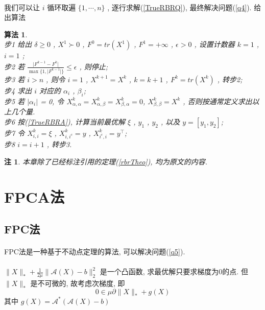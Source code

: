\documentclass[a4paper, UTF8]{ctexart}				%
\newtheorem{remark}{\bf 注}
\newtheorem{algo}{\bf 算法}
\numberwithin{equation}{section}				%
\newcommand{\upcite}[1]{\textsuperscript{\textsuperscript{\cite{#1}}}}
\begin{document}
			\paragraph{}
				\quad 我们可以让 $i$ 循环取遍 $\{1, \cdots, n\}$ , 逐行求解(\ref{TrueRBRQ}), 最终解决问题(\ref{q4}). 给出算法
				\begin{algo}
					\quad\\
					步1 \quad 给出 $\delta \ge 0$ , $X^1 \succ 0$ , $F^0 = tr(X^1)$ , $F^1 = + \infty$ , $\epsilon > 0$ , 设置计数器 $k = 1$ , $i = 1$ ;\\
					步2 \quad 若 $\frac{\lvert{F^{k - 1}-F^k}\rvert}{\max\{1,\lvert{F^{k - 1}}\rvert\}}\leq\epsilon$ , 则停止;\\
					步3 \quad 若 $i>n$ , 则令 $i=1$ , $X^{k + 1}=X^k$ , $k=k + 1$ , $F^k = tr(X^k)$ , 转步2;\\
					步4 \quad 求出 $i$ 对应的 $\alpha_i$ , $\beta_i$;\\
					步5 \quad 若 $\vert{\alpha_i}\vert$ = 0, 令 $X^k_{\alpha, \alpha} = X^k_{\alpha, \beta} = X^k_{\beta, \alpha} = 0$, $X^k_{\beta, \beta} = X^k$ , 否则按通常定义求出以上几个量.\\
					步6 \quad 按(\ref{TrueRBRA}), 计算当前最优解 $\xi$ , $y_1$ , $y_2$ , 以及 $y = [y_1, y_2]$;\\
					步7 \quad 令 $X^{k}_{i, i} = \xi$ , $X^{k}_{i, i^c} = y$ , $X^{k}_{i^c, i} = y^\top$;\\
					步8 \quad $i = i + 1$ , 转步3.\\
				\end{algo}

		\begin{remark}
			本章除了已经标注引用的定理(\ref{rbrTheo}), 均为原文\upcite{goldfarb2009solving}的内容.
		\end{remark}


	\section{FPCA法}
		\subsection{FPC法}
			\paragraph{}
				\quad FPC法是一种基于不动点定理的算法, 可以解决问题(\ref{q5}). 

			\paragraph{}
				\quad $\lVert{X}\rVert_*+\frac{1}{2\mu}\lVert{\mathcal{A}(X)-b}\rVert_2^2$ 是一个凸函数, 求最优解只要求梯度为0的点. 但 $\lVert{X}\rVert_*$ 是不可微的, 故考虑次梯度, 即
				\begin{equation}\label{SubGrad}
					0 \in \mu \partial \lVert{X}\rVert_* + g(X)
				\end{equation}
				其中 $g(X) = \mathcal{A}^*(\mathcal{A}(X) - b)$
			
\end{document}
